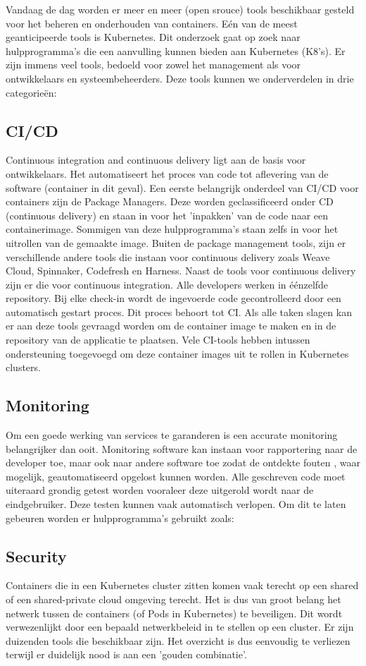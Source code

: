 Vandaag de dag worden er meer en meer (open srouce) tools beschikbaar gesteld voor het beheren en onderhouden van containers. Eén van de meest geanticipeerde tools is Kubernetes. Dit onderzoek gaat op zoek naar hulpprogramma's die een aanvulling kunnen bieden aan Kubernetes (K8's). Er zijn immens veel tools, bedoeld voor zowel het management als voor ontwikkelaars en systeembeheerders. Deze tools kunnen we onderverdelen in drie categorieën:

\subsection{CI/CD}
Continuous integration and continuous delivery ligt aan de basis voor ontwikkelaars. Het automatiseert het proces van code tot aflevering van de software (container in dit geval). Een eerste belangrijk onderdeel van CI/CD voor containers zijn de Package Managers. Deze worden geclassificeerd onder CD (continuous delivery) en staan in voor het 'inpakken' van de code naar een containerimage. Sommigen van deze hulpprogramma's staan zelfs in voor het uitrollen van de gemaakte image.\autocite{Anita,2018a}
Buiten de package management tools, zijn er verschillende andere tools die instaan voor continuous delivery zoals Weave Cloud, Spinnaker, Codefresh en Harness. Naast de tools voor continuous delivery zijn er die voor continuous integration. Alle developers werken in éénzelfde repository. Bij elke check-in wordt de ingevoerde code gecontrolleerd door een automatisch gestart proces. Dit proces behoort tot CI. Als alle taken slagen kan er aan deze tools gevraagd worden om de container image te maken en in de repository van de applicatie te plaatsen. Vele CI-tools hebben intussen ondersteuning toegevoegd om deze container images uit te rollen in Kubernetes clusters.
\subsection{Monitoring}
Om een goede werking van services te garanderen is een accurate monitoring belangrijker dan ooit. Monitoring software kan instaan voor rapportering naar de developer toe, maar ook naar andere software toe zodat de ontdekte fouten , waar mogelijk, geautomatiseerd opgelost kunnen worden.\autocite{Buehrle2018pt2}
Alle geschreven code moet uiteraard grondig getest worden vooraleer deze uitgerold wordt naar de eindgebruiker. Deze testen kunnen vaak automatisch verlopen. Om dit te laten gebeuren worden er hulpprogramma's gebruikt zoals:
\subsection{Security}
Containers die in een Kubernetes cluster zitten komen vaak terecht op een shared of een shared-private cloud omgeving terecht. Het is dus van groot belang het netwerk tussen de containers (of Pods in Kubernetes) te beveiligen. Dit wordt verwezenlijkt door een bepaald netwerkbeleid in te stellen op een cluster.
Er zijn duizenden tools die beschikbaar zijn. Het overzicht is dus eenvoudig te verliezen terwijl er duidelijk nood is aan een 'gouden combinatie'.

